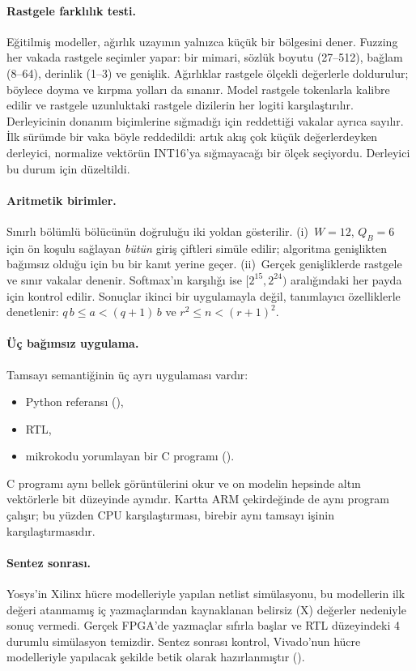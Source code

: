 \paragraph{Rastgele farklılık testi.} Eğitilmiş modeller, ağırlık uzayının yalnızca küçük bir bölgesini dener. Fuzzing
her vakada rastgele seçimler yapar: bir mimari, sözlük boyutu (27--512), bağlam (8--64), derinlik (1--3) ve genişlik.
Ağırlıklar rastgele ölçekli değerlerle doldurulur; böylece doyma ve kırpma yolları da sınanır. Model rastgele tokenlarla
kalibre edilir ve rastgele uzunluktaki rastgele dizilerin her logiti karşılaştırılır. Derleyicinin donanım biçimlerine
sığmadığı için reddettiği vakalar ayrıca sayılır. İlk sürümde bir vaka böyle reddedildi: artık akış çok küçük
değerlerdeyken derleyici, normalize vektörün INT16'ya sığmayacağı bir ölçek seçiyordu. Derleyici bu durum için
düzeltildi.

\paragraph{Aritmetik birimler.} Sınırlı bölümlü bölücünün doğruluğu iki yoldan gösterilir. (i)~$W=12$, $Q_B=6$ için ön
koşulu sağlayan \emph{bütün} giriş çiftleri simüle edilir; algoritma genişlikten bağımsız olduğu için bu bir kanıt
yerine geçer. (ii)~Gerçek genişliklerde rastgele ve sınır vakalar denenir. Softmax'ın karşılığı ise $[2^{15}, 2^{24})$
aralığındaki her payda için kontrol edilir. Sonuçlar ikinci bir uygulamayla değil, tanımlayıcı özelliklerle denetlenir:
$q\,b\le a<(q+1)\,b$ ve $r^2\le n<(r+1)^2$.

\paragraph{Üç bağımsız uygulama.} Tamsayı semantiğinin üç ayrı uygulaması vardır:
\begin{itemize}
  \item Python referansı (),
  \item RTL,
  \item mikrokodu yorumlayan bir C programı ().
\end{itemize}
C programı aynı bellek görüntülerini okur ve on modelin hepsinde altın vektörlerle bit düzeyinde aynıdır. Kartta ARM
çekirdeğinde de aynı program çalışır; bu yüzden CPU karşılaştırması, birebir aynı tamsayı işinin karşılaştırmasıdır.

\paragraph{Sentez sonrası.} Yosys'in Xilinx hücre modelleriyle yapılan netlist simülasyonu, bu modellerin ilk değeri
atanmamış iç yazmaçlarından kaynaklanan belirsiz (X) değerler nedeniyle sonuç vermedi. Gerçek FPGA'de yazmaçlar sıfırla
başlar ve RTL düzeyindeki 4 durumlu simülasyon temizdir. Sentez sonrası kontrol, Vivado'nun hücre modelleriyle yapılacak
şekilde betik olarak hazırlanmıştır ().
